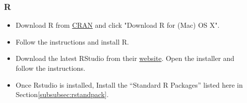 \documentclass[10pt]{article} %
\begin{document}
    \subsubsection{R}

      \begin{itemize}
        \item Download R from \href{http://cran.us.r-project.org/}{CRAN} and click "Download R for (Mac) OS X".
        \item Follow the instructions and install R.
        \item Download the latest RStudio from their \href{https://www.rstudio.com/products/rstudio/download/}{website}.
        Open the installer and follow the instructions.
        \item Once Rstudio is installed, Install the ``Standard R Packages'' listed here in Section\ref{subsubsec:rstandpack}.
      \end{itemize}




\end{document}
